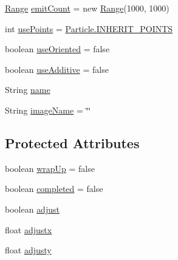 \begin{DoxyCompactItemize}
\item 
\mbox{\hyperlink{classorg_1_1newdawn_1_1slick_1_1particles_1_1_configurable_emitter_1_1_range}{Range}} \mbox{\hyperlink{classorg_1_1newdawn_1_1slick_1_1particles_1_1_configurable_emitter_ada09b861f9d81935e3fb2729e2660871}{emit\+Count}} = new \mbox{\hyperlink{classorg_1_1newdawn_1_1slick_1_1particles_1_1_configurable_emitter_1_1_range}{Range}}(1000, 1000)
\item 
int \mbox{\hyperlink{classorg_1_1newdawn_1_1slick_1_1particles_1_1_configurable_emitter_a70dbcb61667c957161a8c99b3fd563d6}{use\+Points}} = \mbox{\hyperlink{classorg_1_1newdawn_1_1slick_1_1particles_1_1_particle_a6ecc8039f2f03eab74b6b22ce786d176}{Particle.\+I\+N\+H\+E\+R\+I\+T\+\_\+\+P\+O\+I\+N\+TS}}
\item 
boolean \mbox{\hyperlink{classorg_1_1newdawn_1_1slick_1_1particles_1_1_configurable_emitter_ab38e5cf019d342ffd95b3164ed209cac}{use\+Oriented}} = false
\item 
boolean \mbox{\hyperlink{classorg_1_1newdawn_1_1slick_1_1particles_1_1_configurable_emitter_afd81623e5e10467912c83a3f89d32439}{use\+Additive}} = false
\item 
String \mbox{\hyperlink{classorg_1_1newdawn_1_1slick_1_1particles_1_1_configurable_emitter_af63b15389d206c6318e14ff4bc909ac0}{name}}
\item 
String \mbox{\hyperlink{classorg_1_1newdawn_1_1slick_1_1particles_1_1_configurable_emitter_a912693fc97b59864d7ee322ad4f6ec17}{image\+Name}} = \char`\"{}\char`\"{}
\end{DoxyCompactItemize}
\subsection*{Protected Attributes}
\begin{DoxyCompactItemize}
\item 
boolean \mbox{\hyperlink{classorg_1_1newdawn_1_1slick_1_1particles_1_1_configurable_emitter_abb6e55130a2cc7d21ae307aa72fdf45d}{wrap\+Up}} = false
\item 
boolean \mbox{\hyperlink{classorg_1_1newdawn_1_1slick_1_1particles_1_1_configurable_emitter_a0d383b122bb4a38c176b039e3264def3}{completed}} = false
\item 
boolean \mbox{\hyperlink{classorg_1_1newdawn_1_1slick_1_1particles_1_1_configurable_emitter_a04705baa9fdd9ae24da1271094a6bb63}{adjust}}
\item 
float \mbox{\hyperlink{classorg_1_1newdawn_1_1slick_1_1particles_1_1_configurable_emitter_ab50941d712d03e4db8f041b84bd66380}{adjustx}}
\item 
float \mbox{\hyperlink{classorg_1_1newdawn_1_1slick_1_1particles_1_1_configurable_emitter_a9ee9e6c4ac0676c59439b5e93e567873}{adjusty}}
\end{DoxyCompactItemize}
